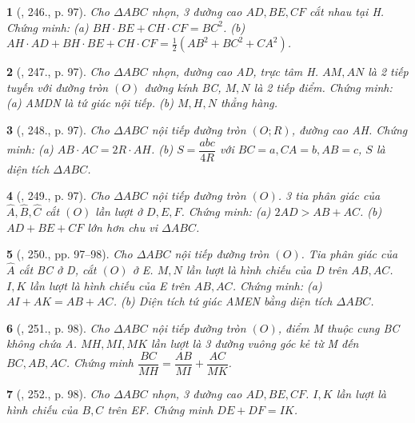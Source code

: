 \documentclass{article}
\newtheorem{baitoan}{}
\begin{document}
\begin{baitoan}[\cite{Binh_Toan_9_tap_2}, 246., p. 97]
	Cho $\Delta ABC$ nhọn, 3 đường cao $AD,BE,CF$ cắt nhau tại H. Chứng minh: (a) $BH\cdot BE + CH\cdot CF = BC^2$. (b) $AH\cdot AD + BH\cdot BE + CH\cdot CF = \frac{1}{2}(AB^2 + BC^2 + CA^2)$.
\end{baitoan}

\begin{baitoan}[\cite{Binh_Toan_9_tap_2}, 247., p. 97]
	Cho $\Delta ABC$ nhọn, đường cao AD, trực tâm H. $AM,AN$ là 2 tiếp tuyến với đường tròn $(O)$ đường kính BC, $M,N$ là 2 tiếp điểm. Chứng minh: (a) AMDN là tứ giác nội tiếp. (b) $M,H,N$ thẳng hàng.
\end{baitoan}

\begin{baitoan}[\cite{Binh_Toan_9_tap_2}, 248., p. 97]
	Cho $\Delta ABC$ nội tiếp đường tròn $(O;R)$, đường cao AH. Chứng minh: (a) $AB\cdot AC = 2R\cdot AH$. (b) $S = \dfrac{abc}{4R}$ với $BC = a,CA = b,AB = c$, $S$ là diện tích $\Delta ABC$.
\end{baitoan}

\begin{baitoan}[\cite{Binh_Toan_9_tap_2}, 249., p. 97]
	Cho $\Delta ABC$ nội tiếp đường tròn $(O)$. 3 tia phân giác của $\widehat{A},\widehat{B},\widehat{C}$ cắt $(O)$ lần lượt ở $D,E,F$. Chứng minh: (a) $2AD > AB + AC$. (b) $AD + BE + CF$ lớn hơn chu vi $\Delta ABC$.
\end{baitoan}

\begin{baitoan}[\cite{Binh_Toan_9_tap_2}, 250., pp. 97--98]
	Cho $\Delta ABC$ nội tiếp đường tròn $(O)$. Tia phân giác của $\widehat{A}$ cắt BC ở D, cắt $(O)$ ở E. $M,N$ lần lượt là hình chiếu của D trên $AB,AC$. $I,K$ lần lượt là hình chiếu của E trên $AB,AC$. Chứng minh: (a) $AI + AK = AB + AC$. (b) Diện tích tứ giác AMEN bằng diện tích $\Delta ABC$.
\end{baitoan}

\begin{baitoan}[\cite{Binh_Toan_9_tap_2}, 251., p. 98]
	Cho $\Delta ABC$ nội tiếp đường tròn $(O)$, điểm M thuộc cung BC không chứa A. $MH,MI,MK$ lần lượt là 3 đường vuông góc kẻ từ M đến $BC,AB,AC$. Chứng minh $\dfrac{BC}{MH} = \dfrac{AB}{MI} + \dfrac{AC}{MK}$.
\end{baitoan}

\begin{baitoan}[\cite{Binh_Toan_9_tap_2}, 252., p. 98]
	Cho $\Delta ABC$ nhọn, 3 đường cao $AD,BE,CF$. $I,K$ lần lượt là hình chiếu của $B,C$ trên EF. Chứng minh $DE + DF = IK$.
\end{baitoan}
\end{document}
